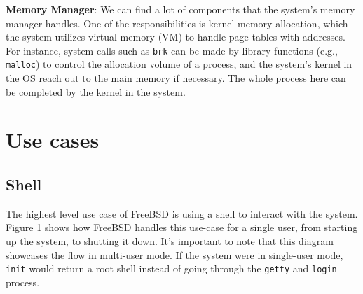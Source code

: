 \documentclass[12pt, dvipsnames, a4paper]{article}
\newcommand{\code}[1]{\texttt{#1}}
\begin{document}
\textbf{Memory Manager}: We can find a lot of components that the system’s memory manager handles. One of the responsibilities is kernel memory allocation, which the system utilizes virtual memory (VM) to handle page tables with addresses. For instance, system calls such as \code{brk} can be made by library functions (e.g., \code{malloc}) to control the allocation volume of a process, and the system’s kernel in the OS reach out to the main memory if necessary. The whole process here can be completed by the kernel in the system.\par


\section{Use cases}

\subsection{Shell}
The highest level use case of FreeBSD is using a shell to interact with the system.
Figure 1 shows how FreeBSD handles this use-case for a single user,
from starting up the system, to shutting it down. It's important to note that
this diagram showcases the flow in multi-user mode. If the system were in
single-user mode, \code{init} would return a root shell instead of going through the
\code{getty} and \code{login} process\cite{bootprocess}\cite{init}.
\end{document}
